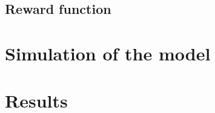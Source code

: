 \documentclass[14pt,a4paper]{article}
\theoremstyle{definition}
\begin{document}
\subsection{Reward function}

\section{Simulation of the model}

\section{Results}



















\newpage
{}




\end{document}
